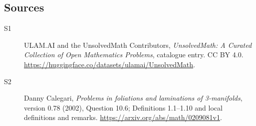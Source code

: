 \documentclass[11pt]{article}
\begin{document}
\subsection{Sources}
\begin{description}
\item[\hypertarget{source:statement:1}{S1}] ULAM.AI and the UnsolvedMath Contributors, \emph{UnsolvedMath: A Curated Collection of Open Mathematics Problems}, catalogue entry. CC BY 4.0. \url{https://huggingface.co/datasets/ulamai/UnsolvedMath}.
\item[\hypertarget{source:statement:2}{S2}] Danny Calegari, \emph{Problems in foliations and laminations of 3-manifolds}, version 0.78 (2002), Question 10.6; Definitions 1.1--1.10 and local definitions and remarks. \url{https://arxiv.org/abs/math/0209081v1}.
\end{description}
\label{end:statement}
\end{document}
